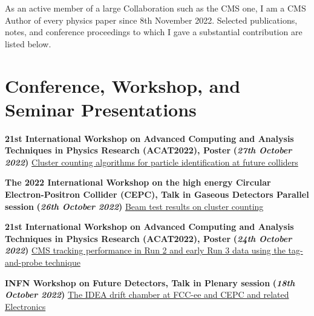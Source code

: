 \documentclass[11pt]{res}
\newcommand{\MarginText}[1]{\section{#1}\vspace{10pt}}
\begin{document}
\begin{resume}
As an active member of a large Collaboration such as the CMS one, I am a CMS Author of every physics paper since 8th November 2022. Selected publications, notes, and conference proceedings to which I gave a substantial contribution are listed below.
\nocite{*}


\vspace{10pt}
\printbibliography[heading=none,sorting=ynt]









\MarginText{Conference, Workshop, and Seminar Presentations}

\textbf{21st International Workshop on Advanced Computing and Analysis Techniques in Physics Research (ACAT2022), Poster} \textbf{(\textit{27th October 2022})}
\href{https://indico.cern.ch/event/1106990/contributions/4998151/}{Cluster counting algorithms for particle identification at future colliders}

\textbf{The 2022 International Workshop on the high energy Circular Electron-Positron Collider (CEPC), Talk in Gaseous Detectors Parallel session} \textbf{(\textit{26th October 2022})}
\href{https://indico.ihep.ac.cn/event/17020/contributions/118085/}{Beam test results on cluster counting}

\textbf{21st International Workshop on Advanced Computing and Analysis Techniques in Physics Research (ACAT2022), Poster} \textbf{(\textit{24th October 2022})}
\href{https://indico.cern.ch/event/1106990/contributions/5096961/}{CMS tracking performance in Run 2 and early Run 3 data using the tag-and-probe technique}

\textbf{INFN Workshop on Future Detectors, Talk in Plenary session} \textbf{(\textit{18th October 2022})}
\href{https://agenda.infn.it/event/31581/contributions/177312/}{The IDEA drift chamber at FCC-ee and CEPC and related Electronics}


\end{resume}
\end{document}
